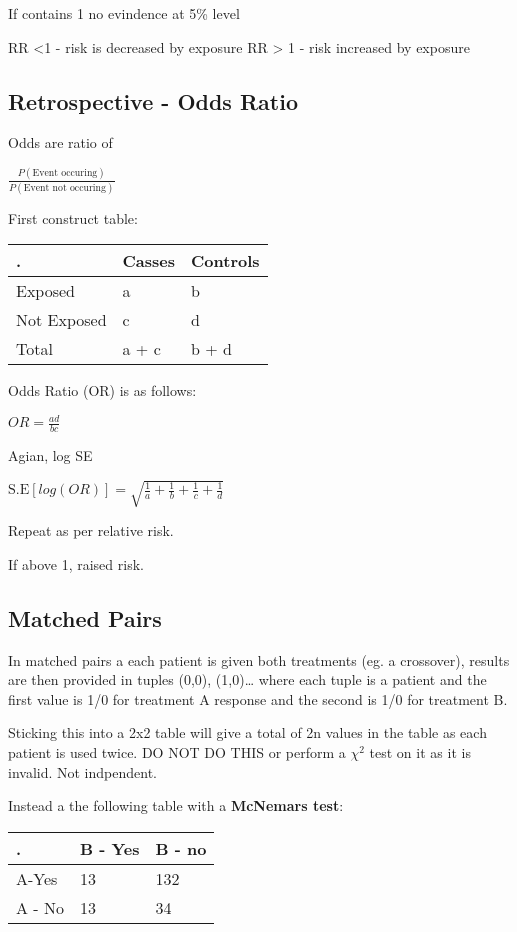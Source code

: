 \documentclass[
  letterpaper,
  DIV=11,
  numbers=noendperiod]{scrreprt}
\begin{document}
If contains 1 no evindence at 5\% level

RR \textless1 - risk is decreased by exposure RR \textgreater{} 1 - risk
increased by exposure

\hypertarget{retrospective---odds-ratio}{%
\subsection{Retrospective - Odds
Ratio}\label{retrospective---odds-ratio}}

Odds are ratio of

\(\frac{P(\text{Event occuring})}{P(\text{Event not occuring})}\)

First construct table:

\begin{longtable}[]{@{}lll@{}}
\toprule()
. & Casses & Controls \\
\midrule()
\endhead
Exposed & a & b \\
Not Exposed & c & d \\
Total & a + c & b + d \\
\bottomrule()
\end{longtable}

Odds Ratio (OR) is as follows:

\(OR = \frac{ad}{bc}\)

Agian, log SE

\(\text{S.E}[log(OR)] = \sqrt{  \frac{1}{a} +  \frac{1}{b}+  \frac{1}{c}+  \frac{1}{d} }\)

Repeat as per relative risk.

If above 1, raised risk.

\hypertarget{matched-pairs}{%
\subsection{Matched Pairs}\label{matched-pairs}}

In matched pairs a each patient is given both treatments (eg. a
crossover), results are then provided in tuples (0,0), (1,0)\ldots{}
where each tuple is a patient and the first value is 1/0 for treatment A
response and the second is 1/0 for treatment B.

Sticking this into a 2x2 table will give a total of 2n values in the
table as each patient is used twice. DO NOT DO THIS or perform a
\(\chi^2\) test on it as it is invalid. Not indpendent.

Instead a the following table with a \textbf{McNemars test}:

\begin{longtable}[]{@{}lll@{}}
\toprule()
. & B - Yes & B - no \\
\midrule()
\endhead
A-Yes & 13 & 132 \\
A - No & 13 & 34 \\
\bottomrule()
\end{longtable}
\end{document}
